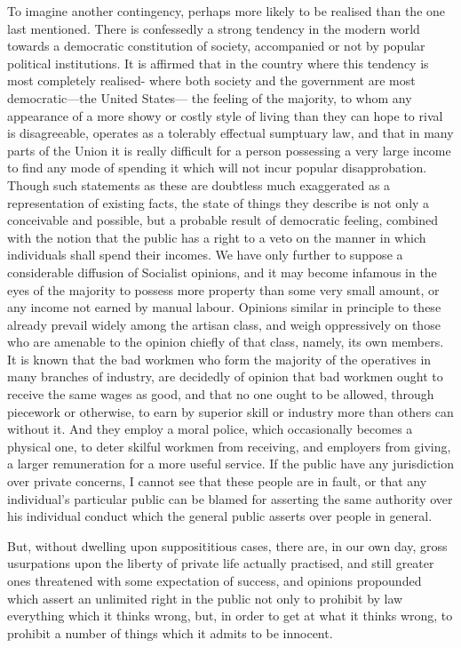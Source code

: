 \documentclass[11pt,openany]{book}
\begin{document}
To imagine another contingency, perhaps more likely to be realised than the one last mentioned. There is confessedly a strong tendency in the modern world towards a democratic constitution of society, accompanied or not by popular political institutions. It is affirmed that in the country where this tendency is most completely realised- where both society and the government are most democratic---the United States--- the feeling of the majority, to whom any appearance of a more showy or costly style of living than they can hope to rival is disagreeable, operates as a tolerably effectual sumptuary law, and that in many parts of the Union it is really difficult for a person possessing a very large income to find any mode of spending it which will not incur popular disapprobation. Though such statements as these are doubtless much exaggerated as a representation of existing facts, the state of things they describe is not only a conceivable and possible, but a probable result of democratic feeling, combined with the notion that the public has a right to a veto on the manner in which individuals shall spend their incomes. We have only further to suppose a considerable diffusion of Socialist opinions, and it may become infamous in the eyes of the majority to possess more property than some very small amount, or any income not earned by manual labour. Opinions similar in principle to these already prevail widely among the artisan class, and weigh oppressively on those who are amenable to the opinion chiefly of that class, namely, its own members. It is known that the bad workmen who form the majority of the operatives in many branches of industry, are decidedly of opinion that bad workmen ought to receive the same wages as good, and that no one ought to be allowed, through piecework or otherwise, to earn by superior skill or industry more than others can without it. And they employ a moral police, which occasionally becomes a physical one, to deter skilful workmen from receiving, and employers from giving, a larger remuneration for a more useful service. If the public have any jurisdiction over private concerns, I cannot see that these people are in fault, or that any individual's particular public can be blamed for asserting the same authority over his individual conduct which the general public asserts over people in general.

But, without dwelling upon supposititious cases, there are, in our own day, gross usurpations upon the liberty of private life actually practised, and still greater ones threatened with some expectation of success, and opinions propounded which assert an unlimited right in the public not only to prohibit by law everything which it thinks wrong, but, in order to get at what it thinks wrong, to prohibit a number of things which it admits to be innocent.
\end{document}
